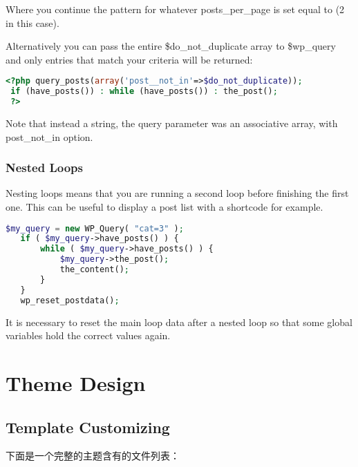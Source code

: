 Where you continue the pattern for whatever posts\_per\_page is set equal to (2 in this case).

Alternatively you can pass the entire \$do\_not\_duplicate array to \$wp\_query and only entries that match your criteria will be returned:

\begin{lstlisting}[language=PHP]
<?php query_posts(array('post__not_in'=>$do_not_duplicate));
 if (have_posts()) : while (have_posts()) : the_post();
 ?>
\end{lstlisting}

Note that instead a string, the query parameter was an associative array, with post\_not\_in option.

\subsection{Nested Loops}

Nesting loops means that you are running a second loop before finishing the first one. This can be useful to display a post list with a shortcode for example. 

\begin{lstlisting}[language=PHP]
   $my_query = new WP_Query( "cat=3" );
   if ( $my_query->have_posts() ) { 
       while ( $my_query->have_posts() ) { 
           $my_query->the_post();
           the_content();
       }
   }
   wp_reset_postdata();
\end{lstlisting}


It is necessary to reset the main loop data after a nested loop so that some global variables hold the correct values again.










\chapter{Theme Design}

\section{Template Customizing}

下面是一个完整的主题含有的文件列表：

